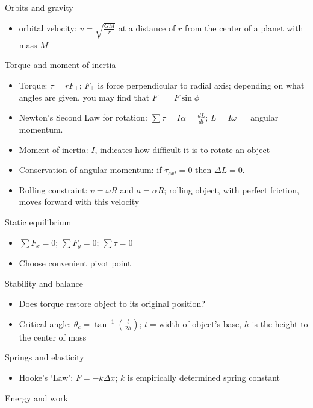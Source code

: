 \documentclass[11pt,letterpaper]{article}
\begin{document}
Orbits and gravity
\begin{itemize}
\item orbital velocity: $v=\displaystyle\sqrt{\displaystyle\frac{GM}{r}}$ at a distance of $r$ from the center of a planet with mass $M$
\end{itemize}
Torque and moment of inertia
\begin{itemize}
\item Torque: $\tau=rF_\perp$; $F_\perp$ is force perpendicular to radial axis; depending on what angles are given, you may find that $F_\perp=F\sin\phi$
\item Newton's Second Law for rotation: $\sum\tau=I\alpha=\displaystyle\frac{dL}{dt}$; $L=I\omega=$ angular momentum.
\item Moment of inertia: $I$, indicates how difficult it is to rotate an object
\item Conservation of angular momentum: if $\tau_{ext}=0$ then $\Delta{L}=0$.
\item Rolling constraint: $v=\omega{R}$ and $a=\alpha{R}$; rolling object, with perfect friction, moves forward with this velocity
\end{itemize}
Static equilibrium
\begin{itemize}
\item $\sum{F_x}=0$; $\sum{F_y}=0$; $\sum\tau=0$
\item Choose convenient pivot point
\end{itemize}
Stability and balance
\begin{itemize}
\item Does torque restore object to its original position?
\item Critical angle: $\theta_c=\tan^{-1}\left(\displaystyle\frac{t}{2h}\right)$; $t=$width of object's base, $h$ is the height to the center of mass
\end{itemize}
Springs and elasticity
 \begin{itemize}
 \item Hooke's `Law': $F=-k\Delta{x}$; $k$ is empirically determined spring constant
\end{itemize}
Energy and work
\end{document}

